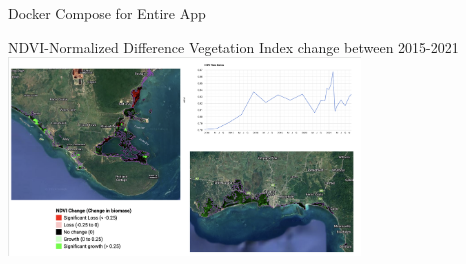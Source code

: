 




\begin{frame}{Docker Compose for Entire App}
\end{frame}

\begin{frame}{NDVI-Normalized Difference Vegetation Index change between 2015-2021}
    \centering
    \includegraphics[height=0.7\textheight,width=0.7\textwidth,keepaspectratio]{mm-images/ndvi.png}
\end{frame}

